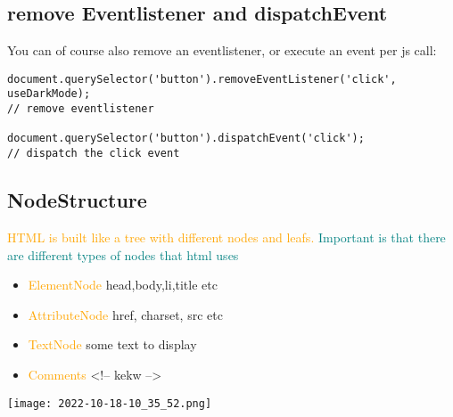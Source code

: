 \documentclass[main.tex,fontsize=6pt,paper=a4,paper=landscape,DIV=calc,]{scrartcl}
\begin{document}
\begin{multicols*}{4}
\subsection{remove Eventlistener and dispatchEvent}  
You can of course also remove an eventlistener, or execute an event per js call:
\vspace{-2mm}
\begin{lstlisting}
document.querySelector('button').removeEventListener('click', useDarkMode);
// remove eventlistener

document.querySelector('button').dispatchEvent('click');
// dispatch the click event
\end{lstlisting}
\vspace{2mm}

\subsection{NodeStructure}  
\textcolor{orange}{HTML is built like a tree with different nodes and leafs.}\newline
\textcolor{teal}{Important is that there are different types of nodes that html uses}
\begin{itemize}
  \item \textcolor{orange}{ElementNode} head,body,li,title etc
  \item \textcolor{orange}{AttributeNode} href, charset, src etc
  \item \textcolor{orange}{TextNode} some text to display
  \item \textcolor{orange}{Comments} <!-- kekw -->
\end{itemize}
\texttt{[image: 2022-10-18-10\_35\_52.png]}


\end{multicols*}
\end{document}
